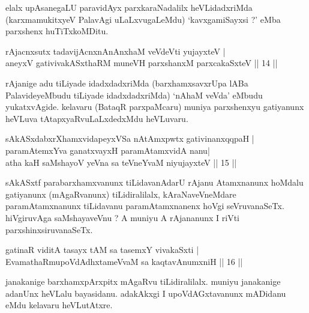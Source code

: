 \begin{artha}
elalx upAsanegaLU paravidAyx parxkaraNadalilx heVLidadxriMda (karxmamukitxyeV PalavAgi uLaLxvugaLeMdu) `kavxgamiSayxsi ?' eMba parxshenx huTiTxkoMDitu.
\end{artha}


\begin{shl}
rAjacnxsutx tadavijAcnxnAnAnxhaM veVdeVti yujayxteV |\\
aneyxV gativivakASxthaRM muneVH parxshanxM parxcakaSxteV \hfill || 14 || 
\end{shl}

\begin{artha}
rAjanige adu tiLiyade idadxdadxriMda (barxhamxsavxrUpa lABa PalavideyeMbudu tiLiyade idadxdadxriMda) `nAhaM veVda' eMbudu yukatxvAgide. kelavaru (BataqR parxpaMcaru) muniya parxshenxyu gatiyanunx heVLuva tAtapxyaRvuLaLxdedxMdu heVLuvaru.
\end{artha}


\begin{shl}
sAkASxdabxrXhamxvidapeyxVSa nA\s \s tAmxpwtx gativinanxqqpaH |\\
paramAtemxYva ganatxvayxH paramAtamxvidA nanu|\\
atha kaH saMshayoV yeVna sa teVneYvaM niyujayxteV \hfill || 15 || 
\end{shl}

\begin{artha}
sAkASxtf parabarxhamxvanunx tiLidavanAdarU rAjanu Atamxnanunx hoMdalu gatiyanunx (mAgaRvanunx) tiLidiralilalx, kAraNaveVneMdare paramAtamxnanunx tiLidavanu paramAtamxnanenx hoVgi seVruvanaSeTx. hiVgiruvAga saMshayaveVnu ? A muniyu A rAjananunx I riVti parxshinxsiruvanaSeTx.
\end{artha}


\begin{shl}
gatinaR viditA tasayx tAM sa tasemxY vivakaSxti |\\
EvamathaRmupoVdAdhxtameVvaM sa kaqtavAnumxniH \hfill || 16 || 
\end{shl}

\begin{artha}
janakanige barxhamxpArxpitx mAgaRvu tiLidiralilalx. muniyu janakanige adanUnx heVLalu bayasidanu. adakAkxgi I upoVdAGxtavanunx mADidanu eMdu kelavaru heVLutAtxre.
\end{artha}

